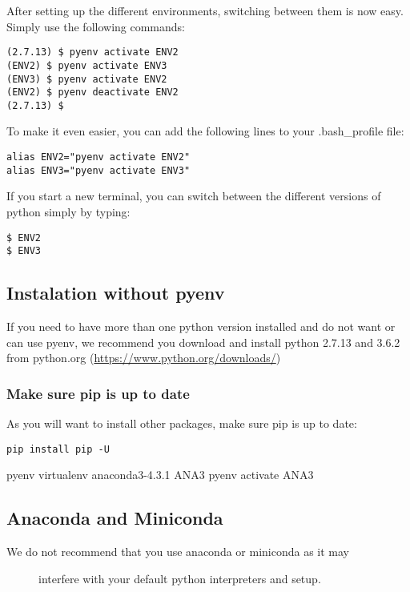 After setting up the different environments, switching between them is
now easy. Simply use the following commands:

\begin{verbatim}
(2.7.13) $ pyenv activate ENV2
(ENV2) $ pyenv activate ENV3
(ENV3) $ pyenv activate ENV2
(ENV2) $ pyenv deactivate ENV2
(2.7.13) $ 
\end{verbatim}

To make it even easier, you can add the following lines to your
.bash\_profile file:

\begin{verbatim}
alias ENV2="pyenv activate ENV2"
alias ENV3="pyenv activate ENV3"
\end{verbatim}

If you start a new terminal, you can switch between the different
versions of python simply by typing:

\begin{verbatim}
$ ENV2
$ ENV3
\end{verbatim}

\subsection{Instalation without
pyenv}\label{instalation-without-pyenv-1}

If you need to have more than one python version installed and do not
want or can use pyenv, we recommend you download and install python
2.7.13 and 3.6.2 from python.org
(\url{https://www.python.org/downloads/})

\subsubsection{Make sure pip is up to
date}\label{make-sure-pip-is-up-to-date}

As you will want to install other packages, make sure pip is up to date:

\begin{verbatim}
pip install pip -U
\end{verbatim}

pyenv virtualenv anaconda3-4.3.1 ANA3 pyenv activate ANA3

\subsection{Anaconda and Miniconda}\label{anaconda-and-miniconda}

\begin{description}
\item[We do not recommend that you use anaconda or miniconda as it may]
interfere with your default python interpreters and setup.
\end{description}

